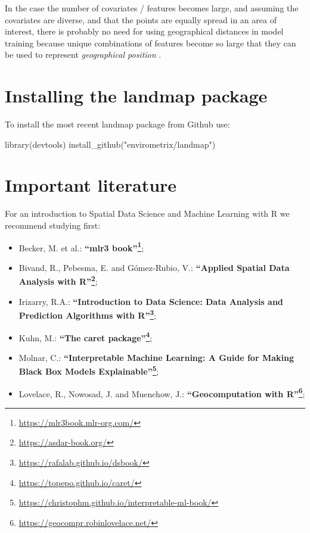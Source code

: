 \documentclass[
  graybox,natbib,nospthms]{svmono}
\newenvironment{Shaded}{\begin{snugshade}}{\end{snugshade}}
\newcommand{\FunctionTok}[1]{\textcolor[rgb]{0,0,0}{#1}}
\newcommand{\NormalTok}[1]{#1}
\newcommand{\StringTok}[1]{\textcolor[rgb]{0.5,0.5,0.5}{#1}}
\providecommand{\tightlist}{%
  \setlength{\itemsep}{0pt}\setlength{\parskip}{0pt}}
\providecommand{\tightlist}{\setlength{\itemsep}{0pt}\setlength{\parskip}{0pt}}
\renewcommand{\href}[2]{#2 (\url{#1})}
\renewcommand{\href}[2]{#2\footnote{\url{#1}}}
\begin{document}
In the case the number of covariates / features becomes large, and assuming the
covariates are diverse, and that the points are equally spread in an area of
interest, there is probably no need for using geographical distances in model
training because unique combinations of features become so large that they can
be used to represent \emph{geographical position} \citep{hengl2018random}.

\hypertarget{installing-the-landmap-package}{%
\section*{Installing the landmap package}\label{installing-the-landmap-package}}

To install the most recent landmap package from Github use:

\begin{Shaded}
\begin{Highlighting}[]
\FunctionTok{library}\NormalTok{(devtools)}
\FunctionTok{install\_github}\NormalTok{(}\StringTok{"envirometrix/landmap"}\NormalTok{)}
\end{Highlighting}
\end{Shaded}

\hypertarget{important-literature}{%
\section*{Important literature}\label{important-literature}}

For an introduction to Spatial Data Science and Machine Learning with R we
recommend studying first:

\begin{itemize}
\tightlist
\item
  Becker, M. et al.: \textbf{\href{https://mlr3book.mlr-org.com/}{``mlr3 book''}};\\
\item
  Bivand, R., Pebesma, E. and Gómez-Rubio, V.: \textbf{\href{https://asdar-book.org/}{``Applied Spatial Data Analysis with R''}};\\
\item
  Irizarry, R.A.: \textbf{\href{https://rafalab.github.io/dsbook/}{``Introduction to Data Science: Data Analysis and Prediction Algorithms with R''}};\\
\item
  Kuhn, M.: \textbf{\href{https://topepo.github.io/caret/}{``The caret package''}};\\
\item
  Molnar, C.: \textbf{\href{https://christophm.github.io/interpretable-ml-book/}{``Interpretable Machine Learning: A Guide for Making Black Box Models Explainable''}};\\
\item
  Lovelace, R., Nowosad, J. and Muenchow, J.: \textbf{\href{https://geocompr.robinlovelace.net/}{``Geocomputation with R''}};
\end{itemize}
\end{document}
